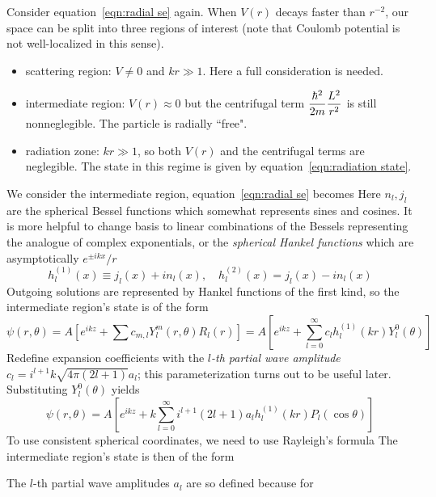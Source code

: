 Consider equation~\ref{eqn:radial se} again. 
When $V(r)$ decays faster than $r^{-2}$, our space 
can be split into three regions of interest 
(note that Coulomb potential is not well-localized in this sense). 
\begin{itemize}
    \item scattering region: $V\neq 0$ and $kr\gg 1$. Here a full consideration 
    is needed. 
    \item intermediate region: $V(r)\approx 0$ but the centrifugal term 
    $\dfrac{\hbar^2}{2m} \dfrac{L^2}{r^2}$ is still nonneglegible. The particle is radially ``free". 
    \item radiation zone:  $kr\gg 1$, so both $V(r)$ and the centrifugal terms are neglegible. 
    The state in this regime is given by equation~\ref{eqn:radiation state}.
\end{itemize}
We consider the intermediate region, equation~\ref{eqn:radial se} becomes 
Here $n_l, j_l$ are the spherical Bessel functions which somewhat represents 
sines and cosines. It is more helpful to change basis to linear combinations 
of the Bessels representing the analogue of complex exponentials, or the 
\textit{spherical Hankel functions} which are asymptotically $e^{\pm ikx}/r$
\[ 
    h_l^{(1)}(x) \equiv j_l(x) + in_l(x), \quad h_l^{(2)}(x) = j_l(x) - in_l(x)
\] 
Outgoing solutions are represented by Hankel functions of the first kind, 
so the intermediate region's state is of the form 
\[ 
    \psi(r, \theta) = A\left[e^{ikz} + \sum c_{m, l} Y^m_l(r, \theta)R_l(r)\right] = 
    A\left[e^{ikz} + \sum_{l=0}^\infty c_l h_l^{(1)}(kr) Y_l^0(\theta)\right]
\] 
Redefine expansion coefficients with the \textit{$l$-th partial wave 
amplitude} $c_l = i^{l+1}k\sqrt{4\pi(2l+1)}a_l$; this parameterization turns 
out to be useful later. Substituting $Y_l^0(\theta)$ yields 
\[ 
    \psi(r, \theta) = A\left[e^{ikz} + 
    k\sum_{l=0}^\infty i^{l+1}(2l+1)a_lh^{(1)}_l(kr) P_l(\cos\theta)\right]
\] 
To use consistent spherical coordinates, we need to use Rayleigh's formula 
The intermediate region's state is then of the form 
\begin{mdframed}
    \end{mdframed}
The $l$-th partial wave amplitudes $a_l$ are so defined because for 
